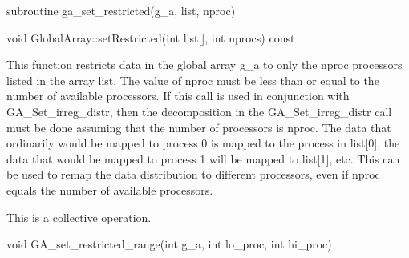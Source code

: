 \documentclass[12pt]{article}
\begin{document}
\begin{fapi}
\begin{fcode}
subroutine ga_set_restricted(g_a, list, nproc)
\end{fcode}
\begin{funcargs}
\end{funcargs}
\end{fapi}

\begin{cxxapi}
\begin{cxxcode}
void GlobalArray::setRestricted(int list[], int nprocs) const
\end{cxxcode}
\begin{funcargs}
\end{funcargs}
\end{cxxapi}

\begin{desc}

  This function restricts data in the global array g_a to only the
  nproc processors listed in the array list. The value of nproc must be
  less than or equal to the number of available processors. If this
  call is used in conjunction with GA_Set_irreg_distr, then the
  decomposition in the GA_Set_irreg_distr call must be done assuming
  that the number of processors is nproc. The data that ordinarily
  would be mapped to process 0 is mapped to the process in list[0],
  the data that would be mapped to process 1 will be mapped to
  list[1], etc. This can be used to remap the data distribution to
  different processors, even if nproc equals the number of available
  processors.

This is a collective operation.

\end{desc}


\begin{capi}
\begin{ccode}
void GA_set_restricted_range(int g_a, int lo_proc, int hi_proc)
\end{ccode}
\begin{funcargs}
\end{funcargs}
\end{capi}
\end{document}
